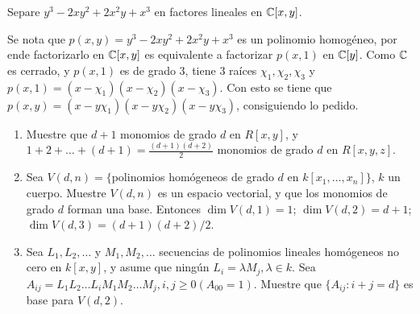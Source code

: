 \begin{prob}{2.33}
    Separe \(y^3-2xy^2+2x^2y+x^3\) en factores lineales en \(\mathbb{C}[x,y]\).
\end{prob}

\begin{sol}{2.33}
    Se nota que \(p(x,y)=y^3-2xy^2+2x^2y+x^3\) es un polinomio homogéneo, por ende factorizarlo en \(\mathbb{C}[x,y]\) es equivalente a factorizar \(p(x,1)\) en \(\mathbb{C}[y]\). Como \(\mathbb{C}\) es cerrado, y \(p(x,1)\) es de grado 3, tiene 3 raíces \(\chi_1,\chi_2,\chi_3\) y \(p(x,1)=(x-\chi_1)(x-\chi_2)(x-\chi_3)\). Con esto se tiene que \(p(x,y)=(x-y\chi_1)(x-y\chi_2)(x-y\chi_3)\), consiguiendo lo pedido.
\end{sol}

\begin{prob}{2.35}
    \begin{enumerate}
        \item Muestre que \(d+1\) monomios de grado \(d\) en \(R[x,y]\), y \(1+2+\dots +(d+1)=\frac{(d+1)(d+2)}2\) monomios de grado \(d\) en \(R[x,y,z]\).
        \item Sea \(V(d,n)=\{\)polinomios homógeneos de grado \(d\) en \(k[x_1,\dots ,x_n]\}\), \(k\) un cuerpo. Muestre \(V(d,n)\)  es un espacio vectorial, y que los monomios de grado \(d\) forman una base. Entonces \(\dim V(d,1)=1\); \(\dim V(d,2)=d+1\); \(\dim V(d,3)=(d+1)(d+2)/2\).
        \item Sea \(L_1,L_2,\dots \) y \(M_1,M_2,\dots \) secuencias de polinomios lineales homógeneos no cero en \(k[x,y]\), y asume que ningún \(L_i=\lambda M_j,\lambda\in k\). Sea \(A_{ij}=L_1L_2\dots L_iM_1M_2\dots M_j,i,j\geq0(A_{00}=1)\). Muestre que \(\{A_{ij}:i+j=d\}\) es base para \(V(d,2)\).
    \end{enumerate}
\end{prob}

